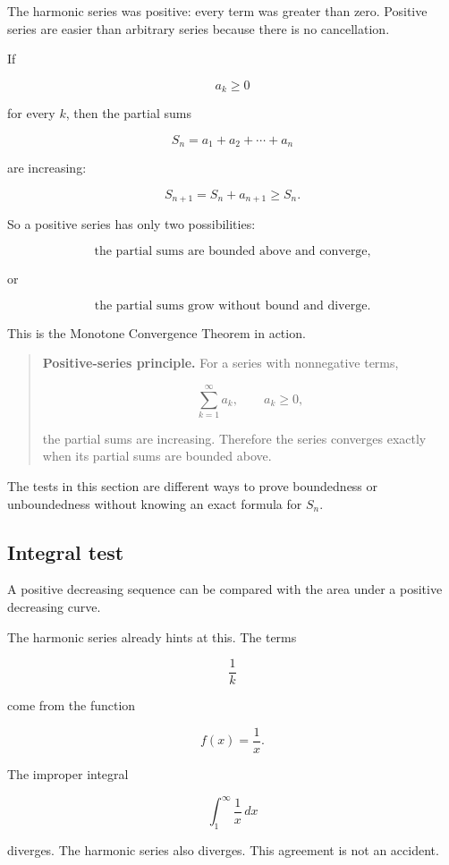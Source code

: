 The harmonic series was positive: every term was greater than zero.  Positive series are
easier than arbitrary series because there is no cancellation.

If

\[
a_k\ge0
\]

for every \(k\), then the partial sums

\[
S_n=a_1+a_2+\cdots+a_n
\]

are increasing:

\[
S_{n+1}=S_n+a_{n+1}\ge S_n.
\]

So a positive series has only two possibilities:

\[
\text{the partial sums are bounded above and converge,}
\]

or

\[
\text{the partial sums grow without bound and diverge.}
\]

This is the Monotone Convergence Theorem in action.

\begin{quote}
\textbf{Positive-series principle.}
For a series with nonnegative terms,

\[
\sum_{k=1}^{\infty}a_k,
\qquad a_k\ge0,
\]

the partial sums are increasing.  Therefore the series converges exactly when its partial
sums are bounded above.
\end{quote}

The tests in this section are different ways to prove boundedness or unboundedness
without knowing an exact formula for \(S_n\).

\subsection{Integral test}
\label{subsec:integral-test}

A positive decreasing sequence can be compared with the area under a positive
decreasing curve.

The harmonic series already hints at this.  The terms

\[
\frac1k
\]

come from the function

\[
f(x)=\frac1x.
\]

The improper integral

\[
\int_1^{\infty}\frac1x\,dx
\]

diverges.  The harmonic series also diverges.  This agreement is not an accident.

